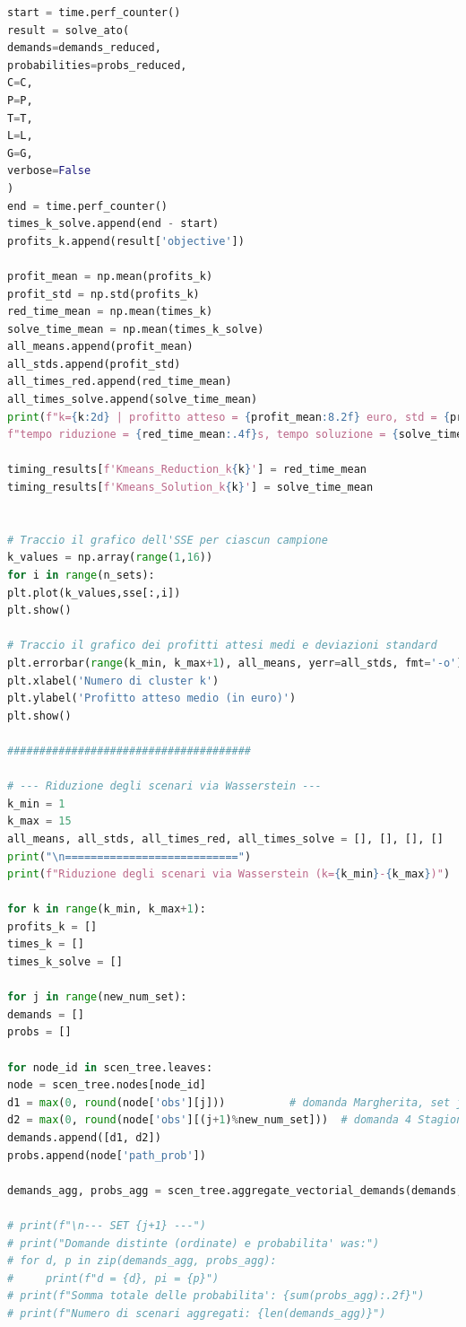 \documentclass[a4paper,12pt]{article}
\begin{document}
\begin{lstlisting}[language=python,caption={Main of ATO problem},label={lst:main-ato}]
start = time.perf_counter()
result = solve_ato(
demands=demands_reduced,
probabilities=probs_reduced,
C=C,
P=P,
T=T,
L=L,
G=G,
verbose=False
)
end = time.perf_counter()
times_k_solve.append(end - start)
profits_k.append(result['objective'])

profit_mean = np.mean(profits_k)
profit_std = np.std(profits_k)    
red_time_mean = np.mean(times_k)
solve_time_mean = np.mean(times_k_solve)
all_means.append(profit_mean)
all_stds.append(profit_std)
all_times_red.append(red_time_mean)
all_times_solve.append(solve_time_mean)
print(f"k={k:2d} | profitto atteso = {profit_mean:8.2f} euro, std = {profit_std:6.2f} euro, "
f"tempo riduzione = {red_time_mean:.4f}s, tempo soluzione = {solve_time_mean:.4f}s")

timing_results[f'Kmeans_Reduction_k{k}'] = red_time_mean
timing_results[f'Kmeans_Solution_k{k}'] = solve_time_mean


# Traccio il grafico dell'SSE per ciascun campione
k_values = np.array(range(1,16))
for i in range(n_sets):
plt.plot(k_values,sse[:,i])
plt.show()

# Traccio il grafico dei profitti attesi medi e deviazioni standard
plt.errorbar(range(k_min, k_max+1), all_means, yerr=all_stds, fmt='-o')
plt.xlabel('Numero di cluster k')
plt.ylabel('Profitto atteso medio (in euro)')
plt.show()

######################################

# --- Riduzione degli scenari via Wasserstein ---
k_min = 1
k_max = 15
all_means, all_stds, all_times_red, all_times_solve = [], [], [], []
print("\n===========================")
print(f"Riduzione degli scenari via Wasserstein (k={k_min}-{k_max})")

for k in range(k_min, k_max+1):
profits_k = []
times_k = []
times_k_solve = []

for j in range(new_num_set):
demands = []
probs = []

for node_id in scen_tree.leaves:
node = scen_tree.nodes[node_id]
d1 = max(0, round(node['obs'][j]))          # domanda Margherita, set j
d2 = max(0, round(node['obs'][(j+1)%new_num_set]))  # domanda 4 Stagioni
demands.append([d1, d2])
probs.append(node['path_prob'])

demands_agg, probs_agg = scen_tree.aggregate_vectorial_demands(demands, probs)

# print(f"\n--- SET {j+1} ---")
# print("Domande distinte (ordinate) e probabilita' was:")
# for d, p in zip(demands_agg, probs_agg):
#     print(f"d = {d}, pi = {p}")
# print(f"Somma totale delle probabilita': {sum(probs_agg):.2f}")
# print(f"Numero di scenari aggregati: {len(demands_agg)}")


\end{lstlisting}
\end{document}
